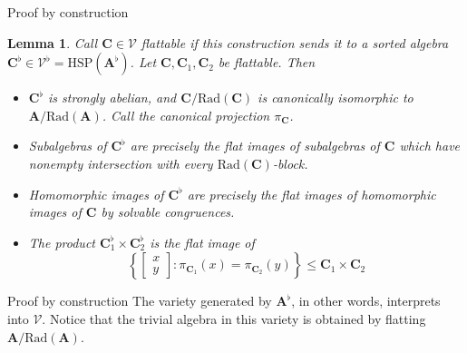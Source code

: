\documentclass[handout]{beamer}
\newcommand{\alg}[1]{\boldsymbol{#1}}
\newcommand{\var}[1]{\mathcal{#1}}
\newcommand{\HSP}[1]{\mathrm{HSP}(#1)}
\newcommand{\Rad}[1]{\mathrm{Rad}(#1)}
\newtheorem*{lem}{Lemma}
\begin{document}
\begin{frame}{Proof by construction}
  \begin{lem}Call \( \alg{C} \in \var{V} \) \emph{flattable} if this construction sends it to a sorted algebra \( \alg{C}^\flat \in \var{V}^\flat = \HSP{\alg{A}^\flat} \). Let \( \alg{C}, \alg{C}_1, \alg{C}_2 \) be flattable. Then
    \begin{itemize}
      \item<2-> \( \alg{C}^\flat \) is strongly abelian, and \( \alg{C} / \Rad{\alg{C}}\) is canonically isomorphic to \( \alg{A} / \Rad{\alg{A}} \). Call the canonical projection \( \pi_{\alg{C}} \).
      \item<3-> Subalgebras of \( \alg{C}^\flat \) are precisely the flat images of subalgebras of \( \alg{C} \) which have nonempty intersection with every \( \Rad{\alg{C}} \)-block.
      \item<4-> Homomorphic images of \( \alg{C}^\flat \) are precisely the flat images of homomorphic images of \( \alg{C} \) by solvable congruences.
      \item<5-> The product \( \alg{C}_1^\flat \times \alg{C}_2^\flat \) is the flat image of
        \[ \left\{ \begin{bmatrix}
          x \\ y
        \end{bmatrix} \colon \pi_{\alg{C}_1}(x) = \pi_{\alg{C}_2}(y)
        \right\} \leq \alg{C}_1 \times \alg{C}_2
        \]
    \end{itemize}
  \end{lem}
\end{frame}

\begin{frame}{Proof by construction}
  The variety generated by \( \alg{A}^\flat \), in other words, interprets into \( \var{V} \). Notice that the trivial algebra in this variety is obtained by flatting \( \alg{A} / \Rad{\alg{A}} \).

  \vspace{.5cm}

  \vspace{.5cm}
\end{frame}
\end{document}
